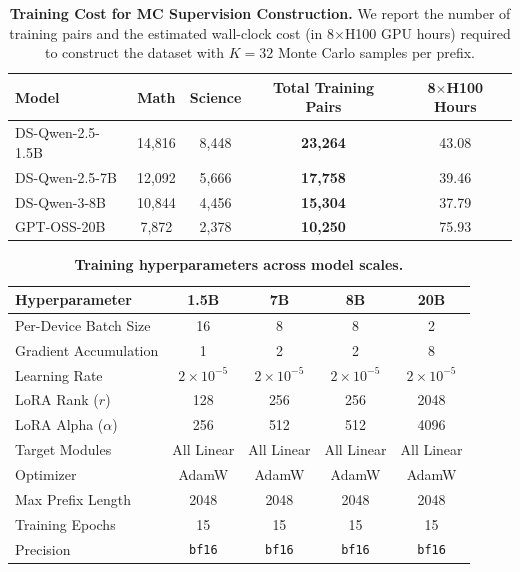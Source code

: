 \documentclass[11pt]{article}
\theoremstyle{plain}
\begin{document}
\begin{table}[t]
\centering
\small
\caption{\textbf{Training Cost for MC Supervision Construction.} 
We report the number of training pairs and the estimated wall-clock cost (in 8$\times$H100 GPU hours) required to construct the dataset with $K=32$ Monte Carlo samples per prefix.}
\label{tab:training_cost}
\begin{tabular}{lcccc}
\toprule
\textbf{Model} & \textbf{Math} & \textbf{Science} & \textbf{Total Training Pairs} & \textbf{8$\times$H100 Hours} \\
\midrule
DS-Qwen-2.5-1.5B & 14,816 & 8,448 & \textbf{23,264} & 43.08 \\
DS-Qwen-2.5-7B   & 12,092 & 5,666 & \textbf{17,758} & 39.46 \\
DS-Qwen-3-8B     & 10,844 & 4,456 & \textbf{15,304} & 37.79 \\
GPT-OSS-20B      & 7,872  & 2,378 & \textbf{10,250} & 75.93 \\
\bottomrule
\end{tabular}
\vspace{-3mm}
\end{table}



\begin{table}[t]
\centering
\small
\caption{\textbf{Training hyperparameters across model scales.}}
\label{tab:training_hyperparams}
\begin{tabular}{lcccc}
\toprule
\textbf{Hyperparameter} & \textbf{1.5B} & \textbf{7B} & \textbf{8B} & \textbf{20B} \\
\midrule
Per-Device Batch Size & 16 & 8 & 8 & 2 \\
Gradient Accumulation & 1 & 2 & 2 & 8 \\
Learning Rate & $2 \times 10^{-5}$ & $2 \times 10^{-5}$ & $2 \times 10^{-5}$ & $2 \times 10^{-5}$ \\
LoRA Rank ($r$) & 128 & 256 & 256 & 2048 \\
LoRA Alpha ($\alpha$) & 256 & 512 & 512 & 4096 \\
Target Modules & All Linear & All Linear & All Linear & All Linear \\
Optimizer & AdamW & AdamW & AdamW & AdamW \\
Max Prefix Length & 2048 & 2048 & 2048 & 2048 \\
Training Epochs & 15 & 15 & 15 & 15 \\
Precision & \texttt{bf16} & \texttt{bf16} & \texttt{bf16} & \texttt{bf16} \\
\bottomrule
\end{tabular}
\vspace{-3mm}
\end{table}
\end{document}
